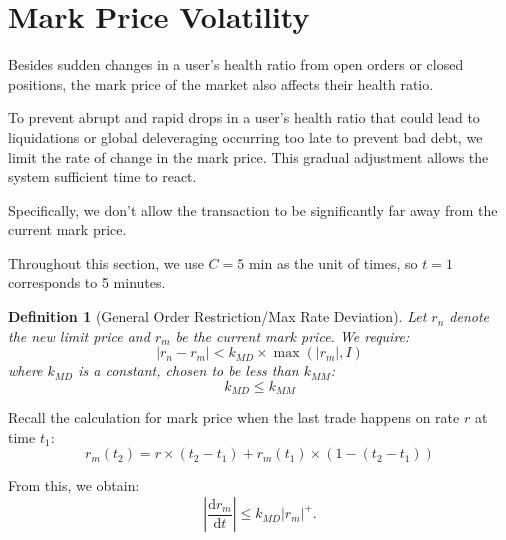 \documentclass[notitlepage,reqno,11pt]{amsart}
\newcommand{\de}{\text{d}}
\numberwithin{equation}{section}
\newtheorem{definition}{Definition}[section]
\begin{document}
\section{Mark Price Volatility}\label{volatility}
Besides sudden changes in a user's health ratio from open orders or closed positions, the mark price of the market also affects their health ratio.

To prevent abrupt and rapid drops in a user's health ratio that could lead to liquidations or global deleveraging occurring too late to prevent bad debt, we limit the rate of change in the mark price. This gradual adjustment allows the system sufficient time to react.

Specifically, we don't allow the transaction to be significantly far away from the current mark price. 

Throughout this section, we use $C = 5\text{ min}$ as the unit of times, so $t=1$ corresponds to 5 minutes.
\begin{definition}[General Order Restriction/Max Rate Deviation]
Let $r_n$ denote the new limit price and $r_m$ be the current mark price. We require:
$$
|r_n - r_m| < k_{MD}\times \max(|r_m|,I) 
$$
where $k_{MD}$ is a constant, chosen to be less than $k_{MM}$:
\[
k_{MD} \leq k_{MM}
\]
    
\end{definition}

Recall the calculation for mark price when the last trade happens on rate $r$ at time $t_1$:
$$
r_m(t_2) = r\times(t_2-t_1) + r_m(t_1)\times (1-(t_2-t_1))
$$

From this, we obtain:
\begin{equation}\label{8.1}
    |\frac{\de r_m}{\de t}| \leq k_{MD} |r_m|^+.
\end{equation}



\end{document}
